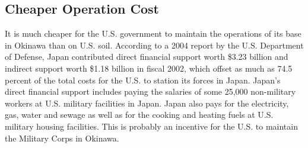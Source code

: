 \documentclass[24 pts]{article}
\begin{document}
\subsection{Cheaper Operation Cost}
It is much cheaper for the U.S. government to maintain the operations of its base in Okinawa than on U.S. soil. According to a 2004 report by the U.S. Department of Defense, Japan contributed direct financial support worth \$3.23 billion and indirect support worth \$1.18 billion in fiscal 2002, which offset as much as 74.5 percent of the total costs for the U.S. to station its forces in Japan. Japan's direct financial support includes paying the salaries of some 25,000 non-military workers at U.S. military facilities in Japan. Japan also pays for the electricity, gas, water and sewage as well as for the cooking and heating fuels at U.S. military housing facilities. This is probably an incentive for the U.S. to maintain the Military Corps in Okinawa.
\end{document}
